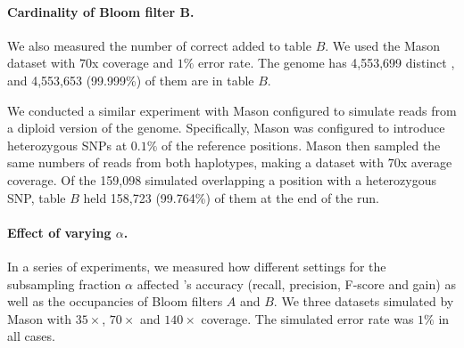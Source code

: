 \documentclass{bmcart}
\begin{document}
\paragraph{Cardinality of Bloom filter B.}  We also measured the number of correct \kmers added to table $B$. We used the Mason dataset with $70$x coverage and $1\%$ error rate. The \ecoli genome has 4,553,699 distinct \kmers, and 4,553,653 (99.999\%) of them are in table $B$.  

We conducted a similar experiment with Mason configured to simulate reads from a diploid version of the \ecoli genome.  Specifically, Mason was configured to introduce heterozygous SNPs at $0.1\%$ of the reference positions. Mason then sampled the same numbers of reads from both haplotypes, making a dataset with $70$x average coverage.
Of the 159,098 simulated \kmers overlapping a position with a heterozygous SNP, table $B$ held 158,723 (99.764\%) of them at the end of the run.

\paragraph{Effect of varying $\alpha$.} In a series of experiments, we measured how different settings for the subsampling fraction $\alpha$ affected \tool's accuracy (recall, precision, F-score and gain) as well as the occupancies of Bloom filters $A$ and $B$.  We three datasets simulated by Mason with $35\times$, $70\times$ and $140\times$ coverage.  The simulated error rate was $1\%$ in all cases.

\end{document}
